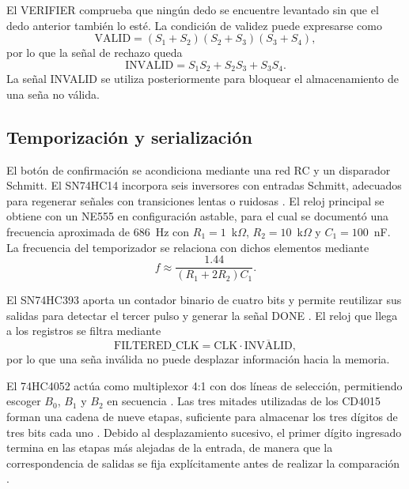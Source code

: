 \documentclass[10pt,journal]{IEEEtran}
\begin{document}
El VERIFIER comprueba que ningún dedo se encuentre levantado sin que el dedo anterior también lo esté. La condición de validez puede expresarse como
\begin{equation}
\mathrm{VALID}=(S_1+S_2)(S_2+S_3)(S_3+S_4),
\end{equation}
por lo que la señal de rechazo queda
\begin{equation}
\mathrm{INVALID}=S_1S_2+S_2S_3+S_3S_4.
\end{equation}
La señal INVALID se utiliza posteriormente para bloquear el almacenamiento de una seña no válida.

\subsection{Temporización y serialización}
El botón de confirmación se acondiciona mediante una red RC y un disparador Schmitt. El SN74HC14 incorpora seis inversores con entradas Schmitt, adecuados para regenerar señales con transiciones lentas o ruidosas \cite{hc14}. El reloj principal se obtiene con un NE555 en configuración astable, para el cual se documentó una frecuencia aproximada de 686~Hz con $R_1=1$~k$\Omega$, $R_2=10$~k$\Omega$ y $C_1=100$~nF. La frecuencia del temporizador se relaciona con dichos elementos mediante \cite{ne555}
\begin{equation}
f\approx\frac{1.44}{(R_1+2R_2)C_1}.
\end{equation}

El SN74HC393 aporta un contador binario de cuatro bits y permite reutilizar sus salidas para detectar el tercer pulso y generar la señal DONE \cite{hc393}. El reloj que llega a los registros se filtra mediante
\begin{equation}
\mathrm{FILTERED\_CLK}=\mathrm{CLK}\cdot\overline{\mathrm{INVALID}},
\end{equation}
por lo que una seña inválida no puede desplazar información hacia la memoria.

El 74HC4052 actúa como multiplexor 4:1 con dos líneas de selección, permitiendo escoger $B_0$, $B_1$ y $B_2$ en secuencia \cite{hc4052}. Las tres mitades utilizadas de los CD4015 forman una cadena de nueve etapas, suficiente para almacenar los tres dígitos de tres bits cada uno \cite{cd4015}. Debido al desplazamiento sucesivo, el primer dígito ingresado termina en las etapas más alejadas de la entrada, de manera que la correspondencia de salidas se fija explícitamente antes de realizar la comparación \cite{bitacora}.
\end{document}
